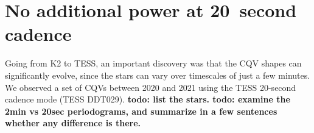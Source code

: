 \documentclass[11pt,twocolumn,tighten]{aastex63}
\begin{document}
\section{No additional power at 20~second cadence}

Going from K2 to TESS, an important discovery was that the CQV shapes
can significantly evolve, since the stars can vary over timescales of just a few minutes.
We observed a set of CQVs between 2020 and 2021 using the TESS 20-second
cadence mode (TESS DDT029).
{\bf todo: list the stars.  todo: examine the 2min vs 20sec periodograms, and summarize in a few
sentences whether any difference is there.}



\clearpage
\listofchanges
\end{document}
